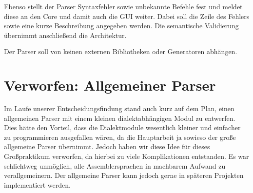 Ebenso stellt der Parser Syntaxfehler sowie unbekannte Befehle fest und meldet diese an den Core
und damit auch die GUI weiter. Dabei soll die Zeile des Fehlers sowie eine kurze Beschreibung angegeben werden.
Die semantische Validierung übernimmt anschließend die Architektur.

Der Parser soll von keinen externen Bibliotheken oder Generatoren abhängen.

\section{Verworfen: Allgemeiner Parser} Im Laufe unserer Entscheidungsfindung
stand auch kurz auf dem Plan, einen allgemeinen Parser mit einem kleinen
dialektabhängigen Modul zu entwerfen.  Dies hätte den Vorteil, dass die
Dialektmodule wesentlich kleiner und einfacher zu programmieren ausgefallen
wären, da die Hauptarbeit ja sowieso der große allgemeine Parser übernimmt.
Jedoch haben wir diese Idee für dieses Großpraktikum verworfen, da hierbei zu
viele Komplikationen entstanden. Es war schlichtweg unmöglich,
alle Assemblersprachen in machbarem Aufwand zu verallgemeinern.
Der allgemeine Parser kann jedoch gerne in späteren Projekten implementiert werden.